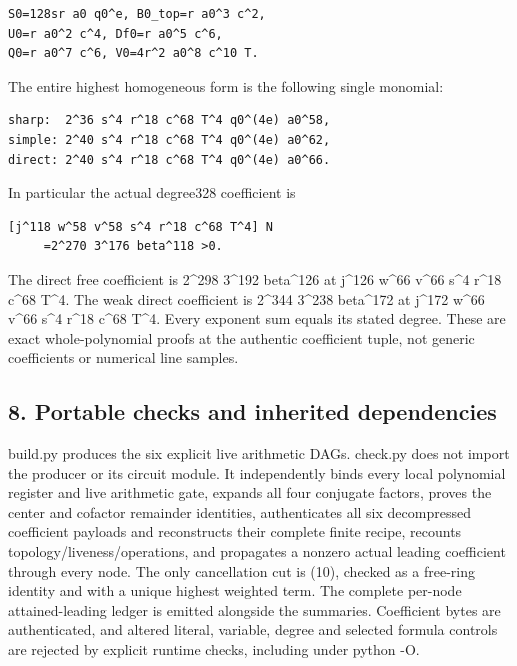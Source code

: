 \begin{verbatim}
S0=128sr a0 q0^e, B0_top=r a0^3 c^2,
U0=r a0^2 c^4, Df0=r a0^5 c^6,
Q0=r a0^7 c^6, V0=4r^2 a0^8 c^10 T.
\end{verbatim}

The entire highest homogeneous form is the following single monomial:



\begin{verbatim}
sharp:  2^36 s^4 r^18 c^68 T^4 q0^(4e) a0^58,
simple: 2^40 s^4 r^18 c^68 T^4 q0^(4e) a0^62,
direct: 2^40 s^4 r^18 c^68 T^4 q0^(4e) a0^66.
\end{verbatim}

In particular the actual degree328 coefficient is



\begin{verbatim}
[j^118 w^58 v^58 s^4 r^18 c^68 T^4] N
     =2^270 3^176 beta^118 >0.
\end{verbatim}

The direct free coefficient is 2\textasciicircum{}\allowbreak{}298 3\textasciicircum{}\allowbreak{}192 beta\textasciicircum{}\allowbreak{}126 at j\textasciicircum{}\allowbreak{}126 w\textasciicircum{}\allowbreak{}66 v\textasciicircum{}\allowbreak{}66 s\textasciicircum{}\allowbreak{}4 r\textasciicircum{}\allowbreak{}18 c\textasciicircum{}\allowbreak{}68 T\textasciicircum{}\allowbreak{}4. The weak direct coefficient is 2\textasciicircum{}\allowbreak{}344 3\textasciicircum{}\allowbreak{}238 beta\textasciicircum{}\allowbreak{}172 at j\textasciicircum{}\allowbreak{}172 w\textasciicircum{}\allowbreak{}66 v\textasciicircum{}\allowbreak{}66 s\textasciicircum{}\allowbreak{}4 r\textasciicircum{}\allowbreak{}18 c\textasciicircum{}\allowbreak{}68 T\textasciicircum{}\allowbreak{}4. Every exponent sum equals its stated degree. These are exact whole-polynomial proofs at the authentic coefficient tuple, not generic coefficients or numerical line samples.



\subsection{8. Portable checks and inherited dependencies}



build.py produces the six explicit live arithmetic DAGs. check.py does not import the producer or its circuit module. It independently binds every local polynomial register and live arithmetic gate, expands all four conjugate factors, proves the center and cofactor remainder identities, authenticates all six decompressed coefficient payloads and reconstructs their complete finite recipe, recounts topology/\allowbreak{}liveness/\allowbreak{}operations, and propagates a nonzero actual leading coefficient through every node. The only cancellation cut is (10), checked as a free-ring identity and with a unique highest weighted term. The complete per-node attained-leading ledger is emitted alongside the summaries. Coefficient bytes are authenticated, and altered literal, variable, degree and selected formula controls are rejected by explicit runtime checks, including under python -O.




